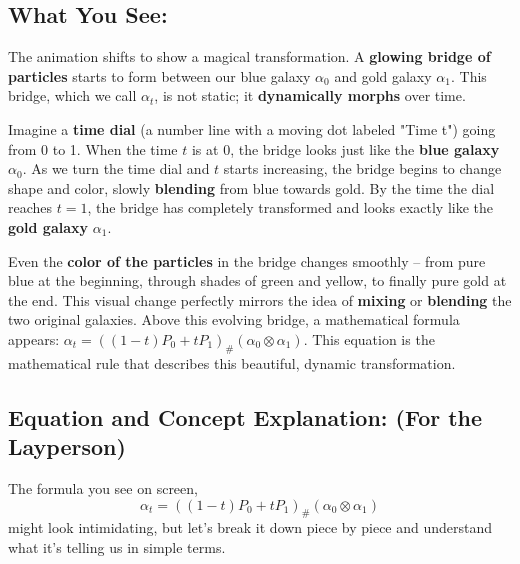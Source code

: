 \documentclass{article}
\begin{document}
\subsection*{What You See:}

The animation shifts to show a magical transformation. A \textbf{glowing bridge of particles} starts to form between our blue galaxy \( \alpha_0 \) and gold galaxy \( \alpha_1 \). This bridge, which we call \textbf{\( \alpha_t \)}, is not static; it \textbf{dynamically morphs} over time.

Imagine a \textbf{time dial} (a number line with a moving dot labeled "Time t") going from 0 to 1.  When the time \( t \) is at 0, the bridge looks just like the \textbf{blue galaxy} \( \alpha_0 \). As we turn the time dial and \( t \) starts increasing, the bridge begins to change shape and color, slowly \textbf{blending} from blue towards gold. By the time the dial reaches \( t=1 \), the bridge has completely transformed and looks exactly like the \textbf{gold galaxy} \( \alpha_1 \).

Even the \textbf{color of the particles} in the bridge changes smoothly – from pure blue at the beginning, through shades of green and yellow, to finally pure gold at the end. This visual change perfectly mirrors the idea of \textbf{mixing} or \textbf{blending} the two original galaxies. Above this evolving bridge, a mathematical formula appears: \( \alpha_t = ((1 - t)P_0 + tP_1)_{\#} (\alpha_0 \otimes \alpha_1) \).  This equation is the mathematical rule that describes this beautiful, dynamic transformation.

\subsection*{Equation and Concept Explanation: (For the Layperson)}

The formula you see on screen,
\[
\alpha_t = ((1 - t)P_0 + tP_1)_{\#} (\alpha_0 \otimes \alpha_1)
\]
might look intimidating, but let's break it down piece by piece and understand what it's telling us in simple terms.
\end{document}
